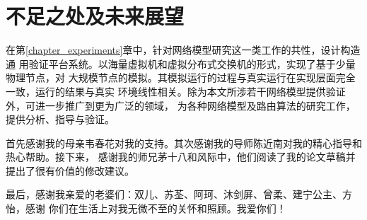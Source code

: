 \documentclass[bachelor,fandolfonts,replaceperiod]{jnuthesis} %
\begin{document}
    \zhlipsum[1-3]
    
    \section{不足之处及未来展望}
    在第\ref{chapter_experiments}章中，针对网络模型研究这一类工作的共性，设计构造通
    用验证平台系统。以海量虚拟机和虚拟分布式交换机的形式，实现了基于少量物理节点，对
    大规模节点的模拟。其模拟运行的过程与真实运行在实现层面完全一致，运行的结果与真实
    环境线性相关。除为本文所涉若干网络模型提供验证外，可进一步推广到更为广泛的领域，
    为各种网络模型及路由算法的研究工作，提供分析、指导与验证。
    
    \begin{backmatter}
    
    \end{backmatter}

    \begin{acknowledgement}
        首先感谢我的母亲韦春花对我的支持。其次感谢我的导师陈近南对我的精心指导和热心帮助。接下来，
        感谢我的师兄茅十八和风际中，他们阅读了我的论文草稿并提出了很有价值的修改建议。
        
        最后，感谢我亲爱的老婆们：双儿、苏荃、阿珂、沐剑屏、曾柔、建宁公主、方怡，感谢
        你们在生活上对我无微不至的关怀和照顾。我爱你们！
    \end{acknowledgement}
    
\end{document}
